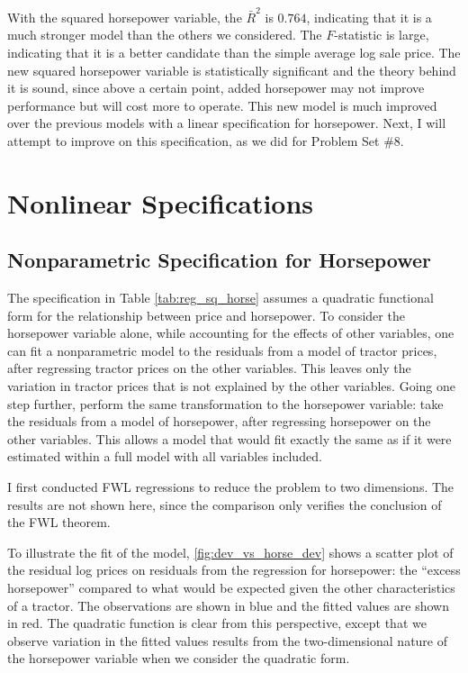 \documentclass[11pt]{paper}
\begin{document}
With the squared horsepower variable, the $\bar{R}^2$ is $0.764$, indicating that it is a much stronger model than the others we considered. 
The $F$-statistic is large, indicating that it is a better candidate than the simple average log sale price. 
The new squared horsepower variable is statistically significant and the theory behind it is sound, since above a certain point, added horsepower may not improve performance but will cost more to operate. 
This new model is much improved over the previous models with a linear specification for horsepower.
Next, I will attempt to improve on this specification, 
as we did for Problem Set \#8. 





\clearpage
\section{Nonlinear Specifications}


\subsection{Nonparametric Specification for Horsepower}


The specification in 
Table \ref{tab:reg_sq_horse}
assumes a quadratic functional form for
the relationship between price and horsepower. 
To consider the horsepower variable alone, 
while accounting for the effects of other variables, 
one can fit a nonparametric model to the residuals 
from a model of tractor prices, 
after regressing tractor prices on the other variables. 
This leaves only the variation in tractor prices that is not explained by the other variables. 
Going one step further, perform the same transformation to the horsepower variable:
take the residuals from a model of horsepower, 
after regressing horsepower on the other variables. 
This allows a model that would fit exactly the same as if it were estimated within a full model with all variables included. 

I first conducted FWL regressions 
to reduce the problem to two dimensions. 
The results are not shown here, 
since the comparison only verifies 
the conclusion of the FWL theorem. 


To illustrate the fit of the model, 
\ref{fig:dev_vs_horse_dev} 
shows a scatter plot 
of the residual log prices on 
residuals from the regression for horsepower:
the ``excess horsepower'' compared to what would be 
expected given the other characteristics of a tractor. 
The observations are shown in blue
and the fitted values are shown in red.
The quadratic function is clear from this perspective, 
except that we observe variation in the fitted values results from the 
two-dimensional nature of the horsepower variable
when we consider the quadratic form.
\end{document}
